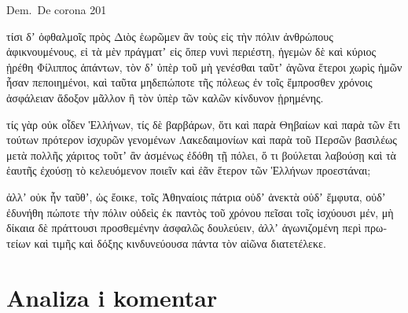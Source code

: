 Dem.\ De corona 201


\medskip


{\large

\begin{greek}

\noindent τίσι δʼ ὀφθαλμοῖς πρὸς Διὸς ἑωρῶμεν ἂν τοὺς εἰς τὴν πόλιν ἀνθρώπους ἀφικνουμένους, εἰ τὰ μὲν πράγματʼ εἰς ὅπερ νυνὶ περιέστη, ἡγεμὼν δὲ καὶ κύριος ᾑρέθη Φίλιππος ἁπάντων, τὸν δʼ ὑπὲρ τοῦ μὴ γενέσθαι ταῦτʼ ἀγῶνα ἕτεροι χωρὶς ἡμῶν ἦσαν πεποιημένοι, καὶ ταῦτα μηδεπώποτε τῆς πόλεως ἐν τοῖς ἔμπροσθεν χρόνοις ἀσφάλειαν ἄδοξον μᾶλλον ἢ τὸν ὑπὲρ τῶν καλῶν κίνδυνον ᾑρημένης.

τίς γὰρ οὐκ οἶδεν Ἑλλήνων, τίς δὲ βαρβάρων, ὅτι καὶ παρὰ Θηβαίων καὶ παρὰ τῶν ἔτι τούτων πρότερον ἰσχυρῶν γενομένων Λακεδαιμονίων καὶ παρὰ τοῦ Περσῶν βασιλέως μετὰ πολλῆς χάριτος τοῦτʼ ἂν ἀσμένως ἐδόθη τῇ πόλει, ὅ τι βούλεται λαβούσῃ καὶ τὰ ἑαυτῆς ἐχούσῃ τὸ κελευόμενον ποιεῖν καὶ ἐᾶν ἕτερον τῶν Ἑλλήνων προεστάναι;

ἀλλʼ οὐκ ἦν ταῦθʼ, ὡς ἔοικε, τοῖς Ἀθηναίοις πάτρια οὐδʼ ἀνεκτὰ οὐδʼ ἔμφυτα, οὐδʼ ἐδυνήθη πώποτε τὴν πόλιν οὐδεὶς ἐκ παντὸς τοῦ χρόνου πεῖσαι τοῖς ἰσχύουσι μέν, μὴ δίκαια δὲ πράττουσι προσθεμένην ἀσφαλῶς δουλεύειν, ἀλλʼ ἀγωνιζομένη περὶ πρωτείων καὶ τιμῆς καὶ δόξης κινδυνεύουσα πάντα τὸν αἰῶνα διατετέλεκε.

\end{greek}

}


\section*{Analiza i komentar}


